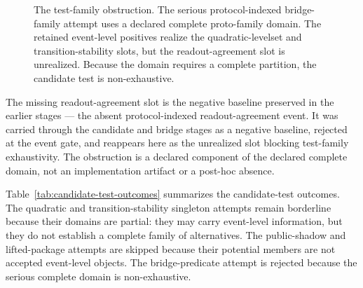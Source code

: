 \documentclass[11pt]{article}
\theoremstyle{definition}
\begin{document}
\begin{figure}[t]
\centering
{}
\caption{The test-family obstruction. The serious protocol-indexed bridge-family attempt uses a declared complete proto-family domain. The retained event-level positives realize the quadratic-levelset and transition-stability slots, but the readout-agreement slot is unrealized. Because the domain requires a complete partition, the candidate test is non-exhaustive.}
\label{fig:test-family-obstruction}
\end{figure}

The missing readout-agreement slot is the negative baseline preserved in the earlier stages — the absent protocol-indexed readout-agreement event. It was carried through the candidate and bridge stages as a negative baseline, rejected at the event gate, and reappears here as the unrealized slot blocking test-family exhaustivity. The obstruction is a declared component of the declared complete domain, not an implementation artifact or a post-hoc absence.

Table~\ref{tab:candidate-test-outcomes} summarizes the candidate-test outcomes. The quadratic and transition-stability singleton attempts remain borderline because their domains are partial: they may carry event-level information, but they do not establish a complete family of alternatives. The public-shadow and lifted-package attempts are skipped because their potential members are not accepted event-level objects. The bridge-predicate attempt is rejected because the serious complete domain is non-exhaustive.
\end{document}
